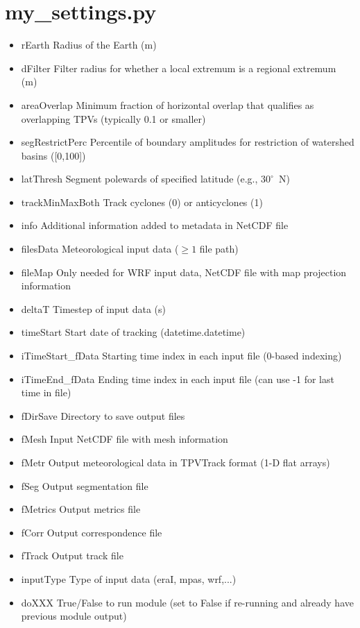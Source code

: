 \documentclass[a4paper]{article}
\begin{document}
\section{my\_settings.py}
\begin{itemize}
\item rEarth Radius of the Earth (m)
\item dFilter Filter radius for whether a local extremum is a regional extremum (m)
\item areaOverlap Minimum fraction of horizontal overlap that qualifies as overlapping TPVs (typically 0.1 or smaller)
\item segRestrictPerc Percentile of boundary amplitudes for restriction of watershed basins ([0,100])
\item latThresh Segment polewards of specified latitude (e.g., $30^{\circ}$~N)
\item trackMinMaxBoth Track cyclones (0) or anticyclones (1)
\item info Additional information added to metadata in NetCDF file
\item filesData Meteorological input data ($\geq 1$ file path)
\item fileMap Only needed for WRF input data, NetCDF file with map projection information
\item deltaT Timestep of input data (s)
\item timeStart Start date of tracking (datetime.datetime)
\item iTimeStart\_fData Starting time index in each input file (0-based indexing)
\item iTimeEnd\_fData Ending time index in each input file (can use -1 for last time in file)
\item fDirSave Directory to save output files
\item fMesh Input NetCDF file with mesh information
\item fMetr Output meteorological data in TPVTrack format (1-D flat arrays)
\item fSeg Output segmentation file
\item fMetrics Output metrics file
\item fCorr Output correspondence file
\item fTrack Output track file
\item inputType Type of input data (eraI, mpas, wrf,...)
\item doXXX True/False to run module (set to False if re-running and already have previous module output)
\end{itemize}
\end{document}
